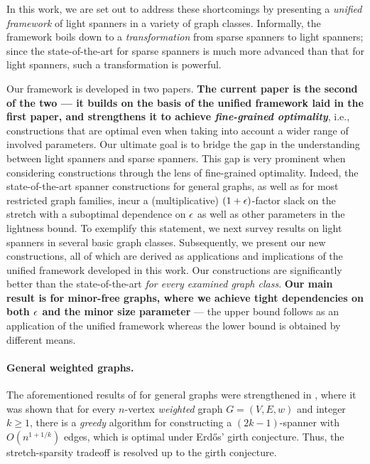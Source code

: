 In this work, we are set out to address these shortcomings by presenting  a {\em unified framework} of light spanners in a variety of graph classes. Informally, the framework boils down to a {\em transformation} from sparse spanners to light spanners; since the state-of-the-art for sparse spanners is much more advanced than that for light spanners, such a transformation is powerful.

Our framework is developed in two papers. 
{\bf The current paper is the second of the two --- it builds on the {basis of the unified framework} laid in the first paper, and strengthens it to achieve {\em fine-grained optimality}}, i.e., constructions that are {optimal even when taking into account a wider range of involved parameters}. Our ultimate goal is to bridge the gap in the understanding between light spanners and sparse spanners.  This gap is very prominent when considering constructions through the lens of fine-grained optimality.  
Indeed, the state-of-the-art spanner constructions for general graphs, as well as for most restricted graph families, incur a (multiplicative) $(1+\epsilon)$-factor slack on the stretch with a suboptimal dependence on $\epsilon$ as well as other parameters in the lightness bound. 
To exemplify this statement, we next survey results on light spanners in several basic graph classes. Subsequently, we present our new constructions, all of which are derived as applications and implications of the unified framework developed in this work. Our constructions are significantly better than the state-of-the-art {\em for every examined graph class}. 
{\bf Our main result is for minor-free graphs, where we achieve tight dependencies on both $\epsilon$ and the minor size parameter} --- the upper bound follows as an application of the unified framework whereas the lower bound is obtained by different means.

\paragraph{General weighted graphs.~} 
The aforementioned results of \cite{PS89,PU89} for general graphs were strengthened in \cite{ADDJS93}, where it was shown that for every $n$-vertex \emph{weighted} graph $G = (V,E,w)$ and integer $k \ge 1$, there is a {\em greedy} algorithm for constructing a $(2k-1)$-spanner with $O(n^{1+1/k})$ edges, which is optimal under Erd\H{o}s' girth conjecture. Thus, the stretch-sparsity tradeoff is resolved up to the girth conjecture. 

